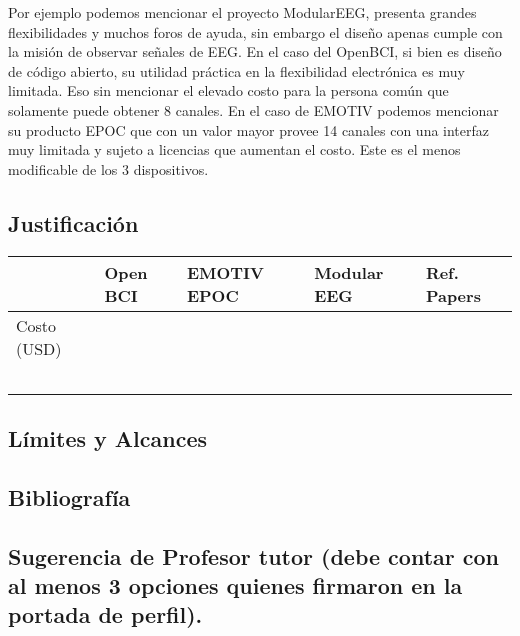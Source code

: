 Por ejemplo podemos mencionar el proyecto ModularEEG, presenta grandes flexibilidades y muchos foros de ayuda, sin embargo el diseño apenas cumple con la misión de observar señales de EEG. En el caso del OpenBCI, si bien es diseño de código abierto, su utilidad práctica en la flexibilidad electrónica es muy limitada. Eso sin mencionar el elevado costo para la persona común que solamente puede obtener 8 canales. En el caso de EMOTIV podemos mencionar su producto EPOC que con un valor mayor provee 14 canales con una interfaz muy limitada y sujeto a licencias que aumentan el costo. Este es el menos modificable de los 3 dispositivos.


\subsection{Justificación}
\label{sec:org49aa1b1}
\begin{center}
\begin{tabular}{lllll}
 & Open BCI & EMOTIV EPOC & Modular EEG & Ref. Papers\\
\hline
Costo (USD) &  &  &  & \\
 &  &  &  & \\
 &  &  &  & \\
 &  &  &  & \\
 &  &  &  & \\
 &  &  &  & \\
\end{tabular}
\end{center}

\subsection{Límites y Alcances}
\label{sec:orgd89f3d1}
\subsection{Bibliografía}
\label{sec:org8e701a0}
\subsection{Sugerencia de Profesor tutor (debe contar con al menos 3 opciones quienes firmaron en la portada de perfil).}
\label{sec:org2103055}
